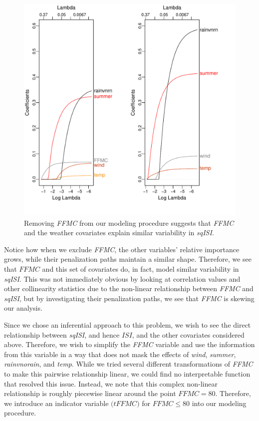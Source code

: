 \documentclass{article}
\begin{document}
\begin{figure}[h!]
\centering
\includegraphics[scale = .4]{penalization_plots.pdf}
\caption{Removing \textit{FFMC} from our modeling procedure suggests that \textit{FFMC} and the weather covariates explain similar variability in \textit{sqISI}.}
\label{fig:pen_plots}{}
\end{figure}
Notice how when we exclude \textit{FFMC}, the other variables' relative importance grows, while their penalization paths maintain a similar shape. Therefore, we see that $\textit{FFMC}$ and this set of covariates do, in fact, model similar variability in \textit{sqISI}. This was not immediately obvious by looking at correlation values and other collinearity statistics due to the non-linear relationship between \textit{FFMC} and \textit{sqISI}, but by investigating their penalization paths, we see that \textit{FFMC} is skewing our analysis. 

Since we chose an inferential approach to this problem, we wish to see the direct relationship between \textit{sqISI}, and hence $\textit{ISI}$, and the other covariates considered above. Therefore, we wish to simplify the \textit{FFMC} variable and use the information from this variable in a way that does not mask the effects of \textit{wind}, \textit{summer}, \textit{rainvnorain}, and \textit{temp}. While we tried several different transformations of \textit{FFMC} to make this pairwise relationship linear, we could find no interpretable function that resolved this issue. Instead, we note that this complex non-linear relationship is roughly piecewise linear around the point $FFMC = 80$. Therefore, we introduce an indicator variable $\textit{(tFFMC)}$ for $FFMC\leq 80$ into our modeling procedure.
\end{document}
